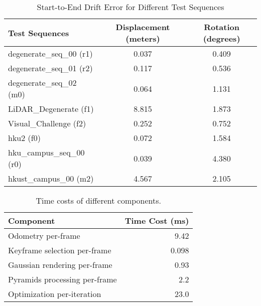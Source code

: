 \documentclass[lettersize,journal]{IEEEtran}
\begin{document}
\begin{table*}[ht]
\centering
\caption{Start-to-End Drift Error for Different Test Sequences}
\label{tab:drift_error}
\begin{tabular}{lcc}
\toprule
\textbf{Test Sequences}          & \textbf{Displacement (meters)} & \textbf{Rotation (degrees)} \\ 
\midrule
degenerate\_seq\_00 (r1)        & 0.037                     & 0.409                 \\ 
degenerate\_seq\_01 (r2)        & 0.117                     & 0.536                 \\ 
degenerate\_seq\_02 (m0)        & 0.064                     & 1.131                 \\ 
LiDAR\_Degenerate (f1)          & 8.815                     & 1.873                 \\ 
Visual\_Challenge (f2)          & 0.252                     & 0.752                 \\ 
hku2 (f0)                       & 0.072                     & 1.584                 \\ 
hku\_campus\_seq\_00 (r0)       & 0.039                     & 4.380                 \\ 
hkust\_campus\_00 (m2)          & 4.567                     & 2.105                 \\ 
\bottomrule
\end{tabular}
\end{table*}

\begin{table}
\centering
\caption{Time costs of different components.}
\renewcommand{\arraystretch}{1.2} %
\setlength{\tabcolsep}{12pt}      %
\begin{tabular}{l r}
\toprule
\textbf{Component}                & \textbf{Time Cost (ms)} \\ \midrule
Odometry per-frame                & 9.42                    \\
Keyframe selection per-frame      & 0.098                   \\
Gaussian rendering per-frame      & 0.93                    \\
Pyramids processing per-frame     & 2.2                     \\
Optimization per-iteration        & 23.0                    \\ \bottomrule
\end{tabular}
\label{tab:time_costs}
\end{table}
\end{document}
